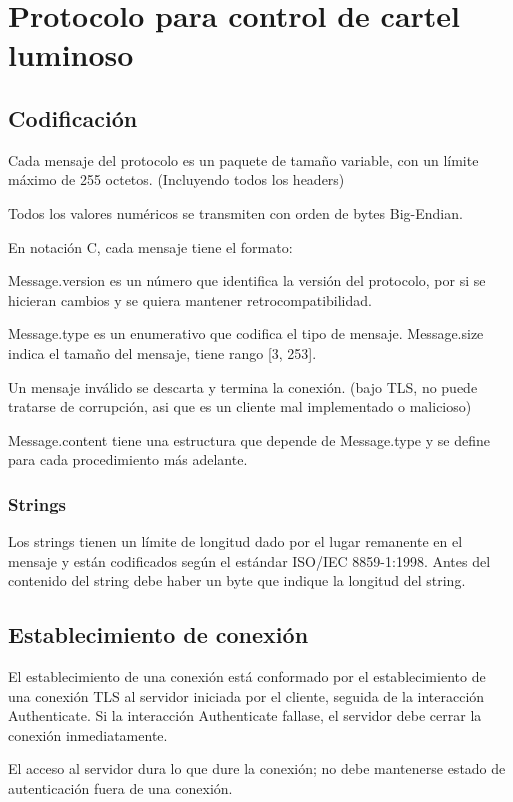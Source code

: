 \section{Protocolo para control de cartel luminoso}

\subsection{Codificación}
Cada mensaje del protocolo es un paquete de tamaño variable, con un límite máximo de 255 octetos. (Incluyendo todos los headers)

Todos los valores numéricos se transmiten con orden de bytes Big-Endian.

En notación C, cada mensaje tiene el formato:

Message.version es un número que identifica la versión del protocolo, por si se hicieran cambios y se quiera mantener retrocompatibilidad.

Message.type es un enumerativo que codifica el tipo de mensaje. Message.size indica el tamaño del mensaje, tiene rango [3, 253].

Un mensaje inválido se descarta y termina la conexión. (bajo TLS, no puede tratarse de corrupción, asi que es un cliente mal implementado o malicioso)

Message.content tiene una estructura que depende de Message.type y se define para cada procedimiento más adelante.

\subsubsection{Strings}
Los strings tienen un límite de longitud dado por el lugar remanente en el mensaje y están codificados según el estándar ISO/IEC 8859-1:1998. Antes del contenido del string debe haber un byte que indique la longitud del string.

\subsection{Establecimiento de conexión}
El establecimiento de una conexión está conformado por el establecimiento de una conexión TLS al servidor iniciada por el cliente, seguida de la interacción Authenticate. Si la interacción Authenticate fallase, el servidor debe cerrar la conexión inmediatamente.

El acceso al servidor dura lo que dure la conexión; no debe mantenerse estado de autenticación fuera de una conexión.

